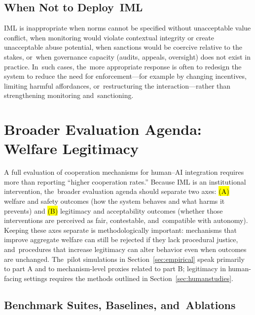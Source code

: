 \documentclass[mca,article,accept,pdftex,oneauthor]{Definitions/mdpi}
\begin{document}
\subsection{When {Not} to Deploy~IML}
\label{sec:when_not}

IML is inappropriate when norms cannot be specified without unacceptable value conflict, when monitoring would violate contextual integrity or create unacceptable abuse potential, when sanctions would be coercive relative to the stakes, or~when governance capacity (audits, appeals, oversight) does not exist in practice. In~such cases, the~more appropriate response is often to redesign the system to reduce the need for enforcement---for example by changing incentives, limiting harmful affordances, or~restructuring the interaction---rather than strengthening monitoring and~sanctioning.

\section[Broader Evaluation Agenda: Welfare and Legitimacy]{Broader Evaluation Agenda: Welfare  %
 Legitimacy}
\label{sec:evaluation}

A full evaluation of cooperation mechanisms for human--AI integration requires more than reporting ``higher cooperation rates.'' Because IML is an institutional intervention, the~broader evaluation agenda should separate two axes: \hl{(A)} %
 welfare and safety outcomes (how the system behaves and what harms it prevents) and \hl{(B)} legitimacy and acceptability outcomes (whether those interventions are perceived as fair, contestable, and~compatible with autonomy). Keeping these axes separate is methodologically important: mechanisms that improve aggregate welfare can still be rejected if they lack procedural justice, and~procedures that increase legitimacy can alter behavior even when outcomes are unchanged. The~pilot simulations in Section~\ref{sec:empirical} speak primarily to part A and to mechanism-level proxies related to part B; legitimacy in human-facing settings requires the methods outlined in Section~\ref{sec:humanstudies}.

\subsection{Benchmark Suites, Baselines, and~Ablations}
\label{sec:sim}
\end{document}
